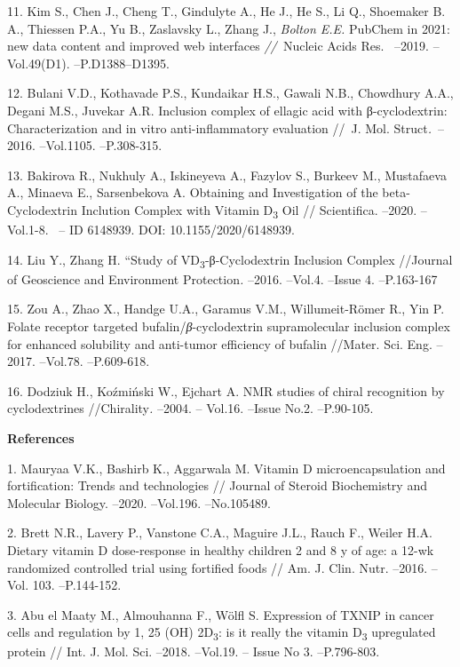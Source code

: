 11. Kim S., Chen J., Cheng T., Gindulyte A., He J., He S., Li Q.,
Shoemaker B. A., Thiessen P.A., Yu B., Zaslavsky L., Zhang J.,
\emph{Bolton E.E.} PubChem in 2021: new data content and improved web
interfaces \emph{//~}Nucleic Acids Res.~ --2019. --Vol.49(D1).
--P.D1388--D1395.

12. Bulani V.D., Kothavade P.S., Kundaikar H.S., Gawali N.B., Chowdhury
A.A., Degani M.S., Juvekar A.R. Inclusion complex of ellagic acid with
β-cyclodextrin: Characterization and in vitro anti-inflammatory
evaluation //~J. Mol. Struct\emph{.}~--2016. --Vol.1105. --P.308-315.

13. Bakirova R., Nukhuly A., Iskineyeva A., Fazylov S., Burkeev M.,
Mustafaeva A., Minaeva E., Sarsenbekova A. Obtaining and Investigation
of the beta-Cyclodextrin Inclution Complex with Vitamin
D\textsubscript{3} Oil // Scientifica. --2020. --Vol.1-8. ~-- ID
6148939. DOI: 10.1155/2020/6148939.

14. Liu Y., Zhang H. ``Study of VD\textsubscript{3}-β-Cyclodextrin
Inclusion Complex //Journal of Geoscience and Environment
Protection\emph{.} --2016. --Vol.4. --Issue 4. --P.163-167

15. Zou A., Zhao X., Handge U.A., Garamus V.M., Willumeit-Römer R., Yin
P. Folate receptor targeted bufalin/\emph{β}-cyclodextrin supramolecular
inclusion complex for enhanced solubility and anti-tumor efficiency of
bufalin //Mater. Sci. Eng. --2017. --Vol.78. --P.609-618.

16. Dodziuk H., Koźmiński W., Ejchart A. NMR studies of chiral
recognition by cyclodextrines //Chirality\emph{.} --2004. -- Vol.16.
--Issue No.2. --P.90-105.

{\bfseries References}

1. Mauryaa V.K., Bashirb K., Aggarwala M. Vitamin D microencapsulation
and fortification: Trends and technologies // Journal of Steroid
Biochemistry and Molecular Biology. --2020. --Vol.196. --No.105489.

2. Brett N.R., Lavery P., Vanstone C.A., Maguire J.L., Rauch F., Weiler
H.A. Dietary vitamin D dose-response in healthy children 2 and 8 y of
age: a 12-wk randomized controlled trial using fortified foods // Am. J.
Clin. Nutr. --2016. -- Vol. 103. --P.144-152.

3. Abu el Maaty M., Almouhanna F., Wölfl S. Expression of TXNIP in
cancer cells and regulation by 1, 25 (OH) 2D\textsubscript{3}: is it
really the vitamin D\textsubscript{3} upregulated protein // Int. J.
Mol. Sci. --2018. --Vol.19. -- Issue No 3. --P.796-803.

